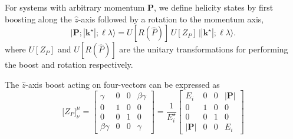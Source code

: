 For systems with arbitrary momentum $\textbf{P}$, we define helicity states by first boosting along the $\hat{z}$-axis followed by a rotation to the momentum axis,
\begin{equation}
\big| \textbf{P}; |\textbf{k}^\star|; \ell \lambda \big\rangle = U[R(\hat{P})]\, U[Z_P]\,  \big| |\textbf{k}^\star|; \ell \lambda \big\rangle.
\end{equation}
where $U[Z_P]$ and $U[R(\hat{P})]$ are the unitary transformations for performing the boost and rotation respectively. 

The $\hat{z}$-axis boost acting on four-vectors can be expressed as
\begin{equation}
	\big[ Z_P \big]^\mu_\nu = 
		\begin{bmatrix} 
			\gamma & 0 & 0 & \beta \gamma \\
			0 & 1 & 0 & 0 \\
			0 & 0 & 1 & 0 \\
			\beta \gamma & 0 & 0 & \gamma	
		\end{bmatrix}
		= \frac{1}{E_i^\star}
		\begin{bmatrix} 
			E_i & 0 & 0 & |\textbf{P}|\\
			0 & 1 & 0 & 0 \\
			0 & 0 & 1 & 0 \\
			|\textbf{P}| & 0 & 0 & E_i	
		\end{bmatrix}
\end{equation}
